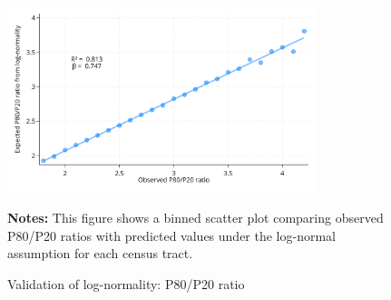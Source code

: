 \begin{figure}[H]
\begin{center}
\captionsetup{justification=centering}
\caption{Validation of log-normality: P80/P20 ratio}
\label{fig:p80p20}
\includegraphics[width=0.8\textwidth]{output/binned_scatter_p80p20.png}
\end{center}
\begin{fignotes2}
\textbf{Notes:} This figure shows a binned scatter plot comparing observed P80/P20 ratios with predicted values under the log-normal assumption for each census tract.
\end{fignotes2}
\end{figure}

